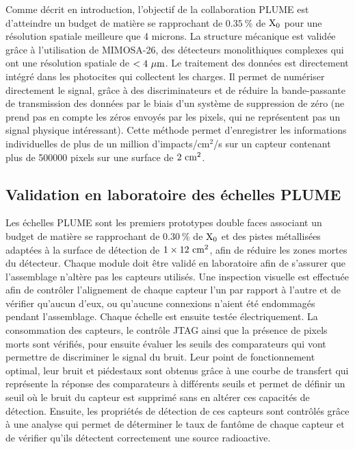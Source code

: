     Comme décrit en introduction, l'objectif de la collaboration PLUME est d'atteindre un budget de matière se rapprochant de $0.35~\%$ de $\rm{X_0}$ pour une résolution spatiale meilleure que 4 microns.
  La structure mécanique est validée grâce à l'utilisation de MIMOSA-26, des détecteurs monolithiques complexes qui ont une résolution spatiale de $< 4~\mu\rm{m}$.
  Le traitement des données est directement intégré dans les photocites qui collectent les charges. 
  Il permet de numériser directement le signal, grâce à des discriminateurs et de réduire la bande-passante de transmission des données par le biais d'un système de suppression de zéro (ne prend pas en compte les zéros envoyés par les pixels, qui ne représentent pas un signal physique intéressant).
  Cette méthode permet d'enregistrer les informations individuelles de plus de un million d'impacts/cm$^2$/s sur un capteur contenant plus de 500000 pixels sur une surface de $2~\rm{cm}^2$.
  
   \subsection{Validation en laboratoire des échelles PLUME}

  Les échelles PLUME sont les premiers prototypes double faces associant un budget de matière se rapprochant de $0.30~\%$ de $\rm{X_0}$ et des pistes métallisées adaptées à la surface de détection de $1 \times 12~\rm{cm}^2$, afin de réduire les zones mortes du détecteur. 
  Chaque module doit être validé en laboratoire afin de s'assurer que l'assemblage n'altère pas les capteurs utilisés.
  Une inspection visuelle est effectuée afin de contrôler l'alignement de chaque capteur l'un par rapport à l'autre et de vérifier qu'aucun d'eux, ou qu'aucune connexions n'aient été endommagés pendant l'assemblage.
  Chaque échelle est ensuite testée électriquement.
  La consommation des capteurs, le contrôle JTAG ainsi que la présence de pi\-xels morts sont vérifiés, pour ensuite évaluer les seuils des comparateurs qui vont permettre de discriminer le signal du bruit.
  Leur point de fonctionnement optimal, leur bruit et piédestaux sont obtenus grâce à une courbe de transfert qui représente la réponse des comparateurs à différents seuils et permet de définir un seuil où le bruit du capteur est supprimé sans en altérer ces capacités de détection.
  Ensuite, les propriétés de détection de ces capteurs sont contrôlés grâce à une analyse qui permet de déterminer le taux de fantôme de chaque capteur et de vérifier qu'ils détectent correctement une source radioactive.
  
